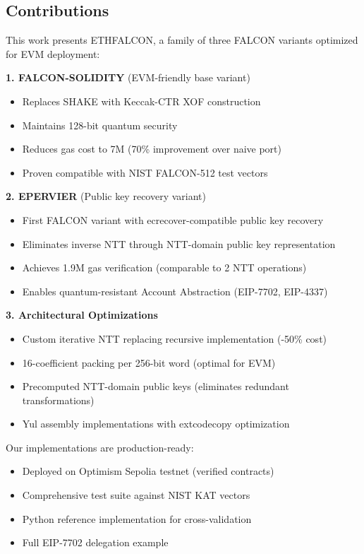\documentclass[11pt,a4paper]{article}
\begin{document}
\subsection{Contributions}

This work presents ETHFALCON, a family of three FALCON variants optimized for EVM deployment:

\textbf{1. FALCON-SOLIDITY} (EVM-friendly base variant)
\begin{itemize}
    \item Replaces SHAKE with Keccak-CTR XOF construction
    \item Maintains 128-bit quantum security
    \item Reduces gas cost to 7M (70\% improvement over naive port)
    \item Proven compatible with NIST FALCON-512 test vectors
\end{itemize}

\textbf{2. EPERVIER} (Public key recovery variant)
\begin{itemize}
    \item First FALCON variant with ecrecover-compatible public key recovery
    \item Eliminates inverse NTT through NTT-domain public key representation
    \item Achieves 1.9M gas verification (comparable to 2 NTT operations)
    \item Enables quantum-resistant Account Abstraction (EIP-7702, EIP-4337)
\end{itemize}

\textbf{3. Architectural Optimizations}
\begin{itemize}
    \item Custom iterative NTT replacing recursive implementation (-50\% cost)
    \item 16-coefficient packing per 256-bit word (optimal for EVM)
    \item Precomputed NTT-domain public keys (eliminates redundant transformations)
    \item Yul assembly implementations with extcodecopy optimization \cite{grassi2023efficient}
\end{itemize}

Our implementations are production-ready:
\begin{itemize}
    \item Deployed on Optimism Sepolia testnet (verified contracts)
    \item Comprehensive test suite against NIST KAT vectors
    \item Python reference implementation for cross-validation
    \item Full EIP-7702 delegation example
\end{itemize}
\end{document}

